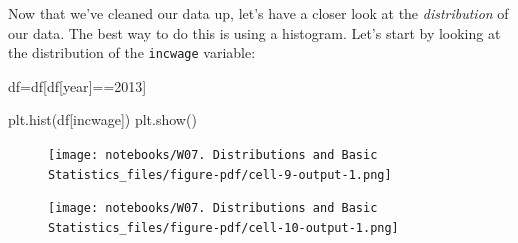 \documentclass[
  letterpaper,
  DIV=11,
  numbers=noendperiod]{scrreprt}
\newenvironment{Shaded}{\begin{snugshade}}{\end{snugshade}}
\newcommand{\DecValTok}[1]{\textcolor[rgb]{0.68,0.00,0.00}{#1}}
\newcommand{\NormalTok}[1]{\textcolor[rgb]{0.00,0.23,0.31}{#1}}
\newcommand{\OperatorTok}[1]{\textcolor[rgb]{0.37,0.37,0.37}{#1}}
\newcommand{\StringTok}[1]{\textcolor[rgb]{0.13,0.47,0.30}{#1}}
\begin{document}
Now that we've cleaned our data up, let's have a closer look at the
\emph{distribution} of our data. The best way to do this is using a
histogram. Let's start by looking at the distribution of the
\texttt{incwage} variable:

\begin{Shaded}
\begin{Highlighting}[]
\NormalTok{df}\OperatorTok{=}\NormalTok{df[df[}\StringTok{\textquotesingle{}year\textquotesingle{}}\NormalTok{]}\OperatorTok{==}\DecValTok{2013}\NormalTok{]}

\NormalTok{plt.hist(df[}\StringTok{\textquotesingle{}incwage\textquotesingle{}}\NormalTok{])}
\NormalTok{plt.show()}
\end{Highlighting}
\end{Shaded}

\begin{figure}[H]

{\centering \texttt{[image: notebooks/W07. Distributions and Basic Statistics\_files/figure-pdf/cell-9-output-1.png]}

}

\end{figure}

\begin{Shaded}
\end{Shaded}

\begin{figure}[H]

{\centering \texttt{[image: notebooks/W07. Distributions and Basic Statistics\_files/figure-pdf/cell-10-output-1.png]}

}

\end{figure}
\end{document}
